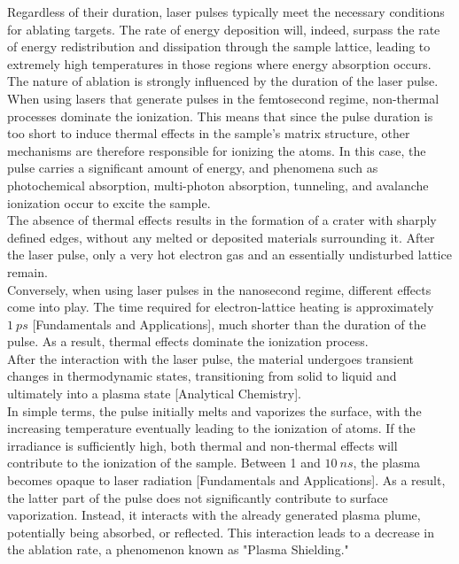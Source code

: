 Regardless of their duration, laser pulses typically meet the necessary conditions for ablating targets. The rate of energy deposition will, indeed, surpass the rate of energy redistribution and dissipation through the sample lattice, leading to extremely high temperatures in those regions where energy absorption occurs.
\\
The nature of ablation is strongly influenced by the duration of the laser pulse.
When using lasers that generate pulses in the femtosecond regime, non-thermal processes dominate the ionization. This means that since the pulse duration is too short to induce thermal effects in the sample's matrix structure, other mechanisms are therefore responsible for ionizing the atoms. In this case, the pulse carries a significant amount of energy, and phenomena such as photochemical absorption, multi-photon absorption, tunneling, and avalanche ionization occur to excite the sample. 
\\
The absence of thermal effects results in the formation of a crater with sharply defined edges, without any melted or deposited materials surrounding it. After the laser pulse, only a very hot electron gas and an essentially undisturbed lattice remain.
\\
Conversely, when using laser pulses in the nanosecond regime, different effects come into play. The time required for electron-lattice heating is approximately $1\:ps$ [Fundamentals and Applications], much shorter than the duration of the pulse. As a result, thermal effects dominate the ionization process.
\\
After the interaction with the laser pulse, the material undergoes transient changes in thermodynamic states, transitioning from solid to liquid and ultimately into a plasma state [Analytical Chemistry].
\\
In simple terms, the pulse initially melts and vaporizes the surface, with the increasing temperature eventually leading to the ionization of atoms. If the irradiance is sufficiently high, both thermal and non-thermal effects will contribute to the ionization of the sample. Between 1 and $10 \: ns$, the plasma becomes opaque to laser radiation [Fundamentals and Applications]. As a result, the latter part of the pulse does not significantly contribute to surface vaporization. Instead, it interacts with the already generated plasma plume, potentially being absorbed, or reflected. This interaction leads to a decrease in the ablation rate, a phenomenon known as "Plasma Shielding." 
\\
